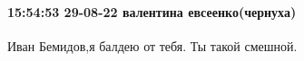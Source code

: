  
 
 
 
 

\paragraph{15:54:53 29-08-22 валентина евсеенко(чернуха)}

Иван Бемидов,я балдею от тебя. Ты такой смешной.
